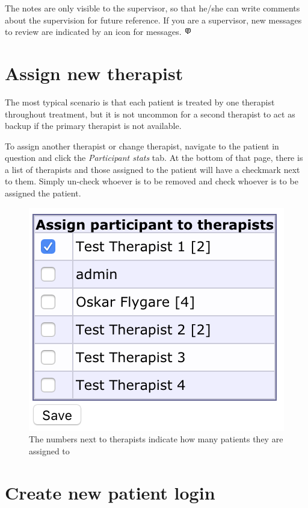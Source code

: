 \documentclass[]{book}
\theoremstyle{definition}
\theoremstyle{definition}
\theoremstyle{definition}
\theoremstyle{remark}
\begin{document}
The notes are only visible to the supervisor, so that he/she can write
comments about the supervision for future reference. If you are a
supervisor, new messages to review are indicated by an icon for
messages. \includegraphics{images/supervision-message.png}

\hypertarget{assign-new-therapist}{%
\section{Assign new therapist}\label{assign-new-therapist}}

The most typical scenario is that each patient is treated by one
therapist throughout treatment, but it is not uncommon for a second
therapist to act as backup if the primary therapist is not available.

To assign another therapist or change therapist, navigate to the patient
in question and click the \emph{Participant stats} tab. At the bottom of
that page, there is a list of therapists and those assigned to the
patient will have a checkmark next to them. Simply un-check whoever is
to be removed and check whoever is to be assigned the patient.

\begin{figure}
\centering
\includegraphics{images/assign-therapist.png}
\caption{The numbers next to therapists indicate how many patients they
are assigned to}
\end{figure}

\hypertarget{create-new-patient-login}{%
\section{Create new patient login}\label{create-new-patient-login}}
\end{document}
